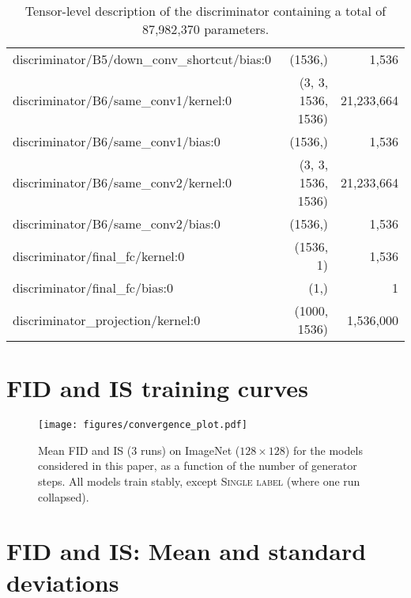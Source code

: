 \documentclass{article}
\newcommand{\slabels}{\textsc{Single label}}
\begin{document}
\begin{table*}[h]
{\begin{tabular}{lrr}
discriminator/B5/down\_conv\_shortcut/bias:0             & (1536,)&       1,536   \\
discriminator/B6/same\_conv1/kernel:0			& (3, 3, 1536, 1536)&  21,233,664   \\
discriminator/B6/same\_conv1/bias:0                      & (1536,)&       1,536   \\
discriminator/B6/same\_conv2/kernel:0			& (3, 3, 1536, 1536)&  21,233,664   \\
discriminator/B6/same\_conv2/bias:0                      & (1536,)&       1,536   \\
discriminator/final\_fc/kernel:0                         & (1536, 1)&       1,536   \\
discriminator/final\_fc/bias:0                           & (1,)&           1   \\
discriminator\_projection/kernel:0			& (1000, 1536)&   1,536,000   \\
\bottomrule
\end{tabular}     }
    \caption{Tensor-level description of the discriminator containing a total of 87,982,370 parameters.}
    \label{tab:discriminator_details}
\end{table*}

\FloatBarrier
\onecolumn
\section{FID and IS training curves}
\begin{figure*}[h!]
\centering
\texttt{[image: figures/convergence\_plot.pdf]}
\caption{Mean FID and IS (3 runs) on ImageNet ($128\times128$) for the models considered in this paper, as a function of the number of generator steps. All models train stably, except \slabels{} (where one run collapsed). \label{fig:convergence}}
\end{figure*}

\FloatBarrier
\onecolumn
\section{FID and IS: Mean and standard deviations} \label{app:meanstd}
\end{document}
